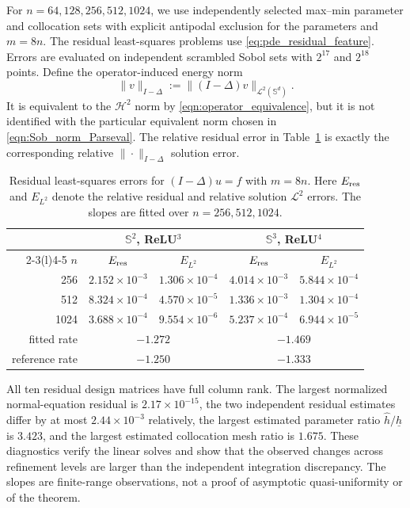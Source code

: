 \documentclass{article}
\numberwithin{equation}{section}
\begin{document}
For $n=64,128,256,512,1024$, we use independently selected max--min
parameter and collocation sets with explicit antipodal exclusion for the
parameters and $m=8n$. The residual least-squares problems use
\eqref{eq:pde_residual_feature}. Errors are evaluated on independent
scrambled Sobol sets with $2^{17}$ and $2^{18}$ points. Define the
operator-induced energy norm
\[
    \|v\|_{I-\Delta}:=\|(I-\Delta)v\|_{\mathcal L^2(\mathbb S^d)}.
\]
It is equivalent to the $\mathcal H^2$ norm by
\eqref{eqn:operator_equivalence}, but it is not identified with the
particular equivalent norm chosen in
\eqref{eqn:Sob_norm_Parseval}. The relative residual error in
Table~\ref{tab:least_squares_pde} is exactly the corresponding relative
$\|\cdot\|_{I-\Delta}$ solution error.

\begin{table}[H]
\centering
\small
\begin{tabular}{@{}rcccc@{}}
\toprule
&\multicolumn{2}{c}{$\mathbb S^2$, ReLU$^3$}
&\multicolumn{2}{c}{$\mathbb S^3$, ReLU$^4$}\\
\cmidrule(lr){2-3}\cmidrule(l){4-5}
$n$ & $E_{\rm res}$ & $E_{L^2}$
& $E_{\rm res}$ & $E_{L^2}$\\
\midrule
256  & $2.152\times10^{-3}$ & $1.306\times10^{-4}$
     & $4.014\times10^{-3}$ & $5.844\times10^{-4}$\\
512  & $8.324\times10^{-4}$ & $4.570\times10^{-5}$
     & $1.336\times10^{-3}$ & $1.304\times10^{-4}$\\
1024 & $3.688\times10^{-4}$ & $9.554\times10^{-6}$
     & $5.237\times10^{-4}$ & $6.944\times10^{-5}$\\
\midrule
fitted rate
     & \multicolumn{2}{c}{$-1.272$}
     & \multicolumn{2}{c}{$-1.469$}\\
reference rate
     & \multicolumn{2}{c}{$-1.250$}
     & \multicolumn{2}{c}{$-1.333$}\\
\bottomrule
\end{tabular}
\caption{Residual least-squares errors for $(I-\Delta)u=f$ with $m=8n$.
Here $E_{\rm res}$ and $E_{L^2}$ denote the relative residual and relative
solution $\mathcal L^2$ errors. The slopes are fitted over
$n=256,512,1024$.}
\label{tab:least_squares_pde}
\end{table}

All ten residual design matrices have full column rank. The largest
normalized normal-equation residual is $2.17\times10^{-15}$, the two
independent residual estimates differ by at most $2.44\times10^{-3}$
relatively, the largest estimated parameter ratio
$\widehat h/\underline h$ is $3.423$, and the largest estimated collocation
mesh ratio is $1.675$. These diagnostics verify the linear solves and show
that the observed changes across refinement levels are larger than the
independent integration discrepancy. The slopes are finite-range
observations, not a proof of asymptotic quasi-uniformity or of the theorem.
\end{document}
